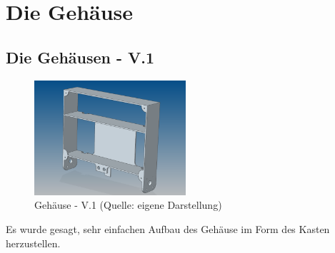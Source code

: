 \newpage
\renewcommand{\autoren}{Valentyn Chepil}
\section{Die Gehäuse}
\subsection{Die Gehäusen - V.1}
\begin{figure}[!h]  %
	\centering\includegraphics[width=0.5\textwidth]{images/gehaeuse-v1.png}
	\caption{Gehäuse - V.1 \newline (Quelle: eigene Darstellung)}
	\label{gehaeuse-v1} %
\end{figure}
Es wurde gesagt, sehr einfachen Aufbau des Gehäuse im Form des Kasten herzustellen.
